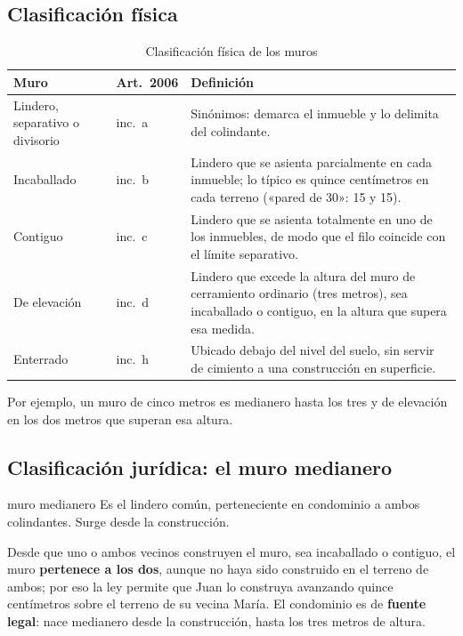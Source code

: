 \documentclass[12pt,oneside]{book}
\begin{document}
\subsection{Clasificación física}

\begin{table}[H]
\centering
\small
\begin{tabularx}{\textwidth}{>{\raggedright\arraybackslash}p{}>{\raggedright\arraybackslash}p{}>{\raggedright\arraybackslash}X}
\toprule
\textbf{Muro} & \textbf{Art.~2006} & \textbf{Definición} \\
\midrule
Lindero, separativo o divisorio & inc.~a & Sinónimos: demarca el inmueble y lo delimita del colindante. \\
Incaballado & inc.~b & Lindero que se asienta parcialmente en cada inmueble; lo típico es quince centímetros en cada terreno («pared de 30»: 15 y 15). \\
Contiguo & inc.~c & Lindero que se asienta totalmente en uno de los inmuebles, de modo que el filo coincide con el límite separativo. \\
De elevación & inc.~d & Lindero que excede la altura del muro de cerramiento ordinario (tres metros), sea incaballado o contiguo, en la altura que supera esa medida. \\
Enterrado & inc.~h & Ubicado debajo del nivel del suelo, sin servir de cimiento a una construcción en superficie. \\
\bottomrule
\end{tabularx}
\caption{Clasificación física de los muros}
\end{table}

Por ejemplo, un muro de cinco metros es medianero hasta los tres y de elevación en los dos metros que superan esa altura.

\subsection{Clasificación jurídica: el muro medianero}

\begin{definicion}{muro medianero}
Es el lindero común, perteneciente en condominio a ambos colindantes. Surge desde la construcción.
\end{definicion}

Desde que uno o ambos vecinos construyen el muro, sea incaballado o contiguo, el muro \textbf{pertenece a los dos}, aunque no haya sido construido en el terreno de ambos; por eso la ley permite que Juan lo construya avanzando quince centímetros sobre el terreno de su vecina María. El condominio es de \textbf{fuente legal}: nace medianero desde la construcción, hasta los tres metros de altura.
\end{document}
